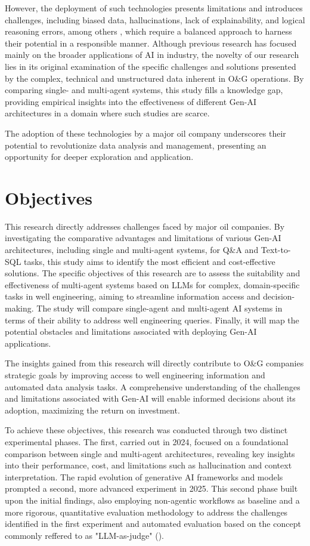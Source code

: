     However, the deployment of such technologies presents limitations and introduces challenges, including biased data, hallucinations, lack of explainability, and logical reasoning errors, among others \cite{Hadi2023}, which require a balanced approach to harness their potential in a responsible manner.    
    Although previous research has focused mainly on the broader applications of AI in industry, the novelty of our research lies in its original examination of the specific challenges and solutions presented by the complex, technical and unstructured data inherent in O\&G operations. By comparing single- and multi-agent systems, this study fills a knowledge gap, providing empirical insights into the effectiveness of different Gen-AI architectures in a domain where such studies are scarce. 
    
    The adoption of these technologies by a major oil company underscores their potential to revolutionize data analysis and management, presenting an opportunity for deeper exploration and application.


\section{Objectives}

    This research directly addresses challenges faced by major oil companies. By investigating the comparative advantages and limitations of various Gen-AI architectures, including single and multi-agent systems, for Q\&A and Text-to-SQL tasks, this study aims to identify the most efficient and cost-effective solutions.
    The specific objectives of this research are to assess the suitability and effectiveness of multi-agent systems based on LLMs for complex, domain-specific tasks in well engineering, aiming to streamline information access and decision-making. 
    The study will compare single-agent and multi-agent AI systems in terms of their ability to address well engineering queries. Finally, it will map the potential obstacles and limitations associated with deploying Gen-AI applications.
            
    The insights gained from this research will directly contribute to O\&G companies strategic goals by improving access to well engineering information and automated data analysis tasks. 
    A comprehensive understanding of the challenges and limitations associated with Gen-AI will enable informed decisions about its adoption, maximizing the return on investment. 

    To achieve these objectives, this research was conducted through two distinct experimental phases. The first, carried out in 2024, focused on a foundational comparison between single and multi-agent architectures, revealing key insights into their performance, cost, and limitations such as hallucination and context interpretation. The rapid evolution of generative AI frameworks and models prompted a second, more advanced experiment in 2025. This second phase built upon the initial findings, also employing non-agentic workflows as baseline and a more rigorous, quantitative evaluation methodology to address the challenges identified in the first experiment and automated evaluation based on the concept commonly reffered to as "LLM-as-judge" (\cite{Gu2025}).

